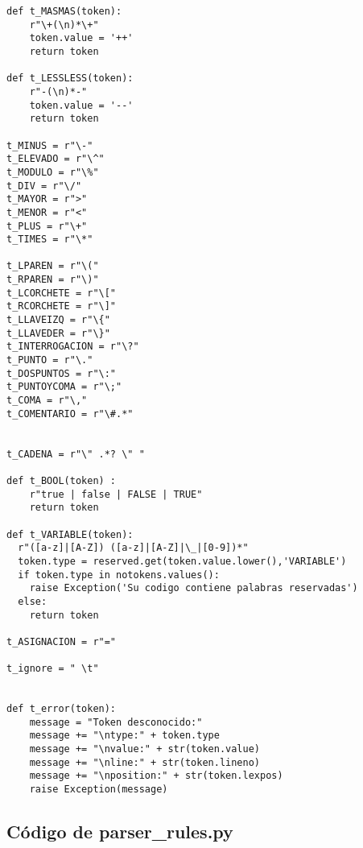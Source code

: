 \begin{verbatim}
def t_MASMAS(token):
    r"\+(\n)*\+"
    token.value = '++'
    return token

def t_LESSLESS(token):
    r"-(\n)*-"
    token.value = '--'
    return token

t_MINUS = r"\-"
t_ELEVADO = r"\^"
t_MODULO = r"\%"
t_DIV = r"\/"
t_MAYOR = r">"
t_MENOR = r"<"
t_PLUS = r"\+"
t_TIMES = r"\*"

t_LPAREN = r"\("
t_RPAREN = r"\)"
t_LCORCHETE = r"\["
t_RCORCHETE = r"\]"
t_LLAVEIZQ = r"\{"
t_LLAVEDER = r"\}"
t_INTERROGACION = r"\?"
t_PUNTO = r"\."
t_DOSPUNTOS = r"\:"
t_PUNTOYCOMA = r"\;"
t_COMA = r"\,"
t_COMENTARIO = r"\#.*"


t_CADENA = r"\" .*? \" "

def t_BOOL(token) : 
    r"true | false | FALSE | TRUE"
    return token

def t_VARIABLE(token):
  r"([a-z]|[A-Z]) ([a-z]|[A-Z]|\_|[0-9])*"
  token.type = reserved.get(token.value.lower(),'VARIABLE')
  if token.type in notokens.values():
  	raise Exception('Su codigo contiene palabras reservadas')
  else:	
	return token

t_ASIGNACION = r"="

t_ignore = " \t"


def t_error(token):
    message = "Token desconocido:"
    message += "\ntype:" + token.type
    message += "\nvalue:" + str(token.value)
    message += "\nline:" + str(token.lineno)
    message += "\nposition:" + str(token.lexpos)
    raise Exception(message)

\end{verbatim}

\subsection{Código de parser\_rules.py }

